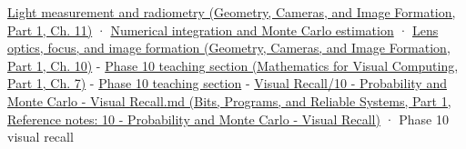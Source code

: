 \href{../03-Geometry-Cameras-and-Image-Formation-P01/main.pdf\#03-visual-computing-i-ch004-light-measurement-and-radiometry}{Light measurement and radiometry (Geometry, Cameras, and Image Formation, Part 1, Ch. 11)} · \hyperref[03-visual-computing-i-ch012-numerical-integration-and-monte-carlo-estimation]{Numerical integration and Monte Carlo estimation} · \href{../03-Geometry-Cameras-and-Image-Formation-P01/main.pdf\#03-visual-computing-i-ch003-lens-optics-focus-and-image-formation}{Lens optics, focus, and image formation (Geometry, Cameras, and Image Formation, Part 1, Ch. 10)} - \href{../02-Mathematics-for-Visual-Computing-P01/main.pdf\#02-foundations-ii-ch023-random-quantities-and-their-probability-laws}{Phase 10 teaching section (Mathematics for Visual Computing, Part 1, Ch. 7)} - \hyperref[02-foundations-ii-ch029-transformations-turn-simple-inputs-into-useful-samples]{Phase 10 teaching section} - \href{../01-Bits-Programs-and-Reliable-Systems-P01/main.pdf\#appendix-cb5af353ef77}{Visual Recall/10 - Probability and Monte Carlo - Visual Recall.md (Bits, Programs, and Reliable Systems, Part 1, Reference notes: 10 - Probability and Monte Carlo - Visual Recall)} · Phase 10 visual recall
